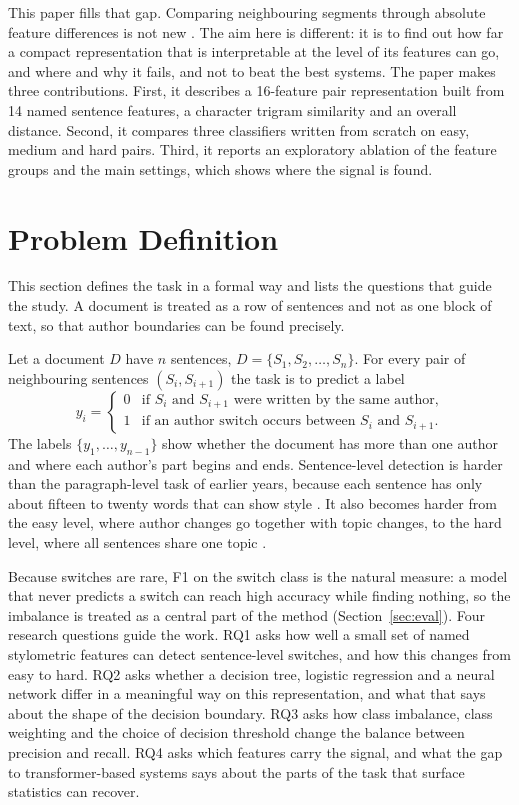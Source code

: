 \documentclass[runningheads]{llncs}
\begin{document}
This paper fills that gap. Comparing neighbouring segments through absolute feature differences is not new \cite{ramnial2015authorship,singh2021writing}. The aim here is different: it is to find out how far a compact representation that is interpretable at the level of its features can go, and where and why it fails, and not to beat the best systems. The paper makes three contributions. First, it describes a 16-feature pair representation built from 14 named sentence features, a character trigram similarity and an overall distance. Second, it compares three classifiers written from scratch on easy, medium and hard pairs. Third, it reports an exploratory ablation of the feature groups and the main settings, which shows where the signal is found.

\section{Problem Definition}
\label{sec:problem}

This section defines the task in a formal way and lists the questions that guide the study. A document is treated as a row of sentences and not as one block of text, so that author boundaries can be found precisely.

Let a document $D$ have $n$ sentences, $D = \{S_1, S_2, \ldots, S_n\}$. For every pair of neighbouring sentences $(S_i, S_{i+1})$ the task is to predict a label
\[
y_i =
\begin{cases}
0 & \text{if } S_i \text{ and } S_{i+1} \text{ were written by the same author,} \\
1 & \text{if an author switch occurs between } S_i \text{ and } S_{i+1}.
\end{cases}
\]
The labels $\{y_1, \ldots, y_{n-1}\}$ show whether the document has more than one author and where each author's part begins and ends. Sentence-level detection is harder than the paragraph-level task of earlier years, because each sentence has only about fifteen to twenty words that can show style \cite{zangerle_2026_19068843}. It also becomes harder from the easy level, where author changes go together with topic changes, to the hard level, where all sentences share one topic \cite{zangerle2025overview}.

Because switches are rare, F1 on the switch class is the natural measure: a model that never predicts a switch can reach high accuracy while finding nothing, so the imbalance is treated as a central part of the method (Section~\ref{sec:eval}). Four research questions guide the work. RQ1 asks how well a small set of named stylometric features can detect sentence-level switches, and how this changes from easy to hard. RQ2 asks whether a decision tree, logistic regression and a neural network differ in a meaningful way on this representation, and what that says about the shape of the decision boundary. RQ3 asks how class imbalance, class weighting and the choice of decision threshold change the balance between precision and recall. RQ4 asks which features carry the signal, and what the gap to transformer-based systems says about the parts of the task that surface statistics can recover.
\end{document}
